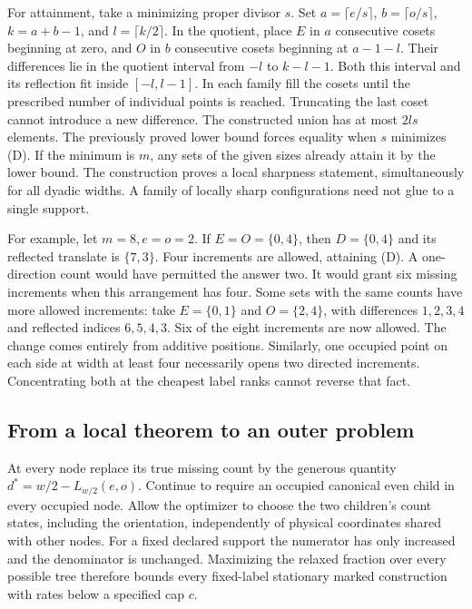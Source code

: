 For attainment, take a minimizing proper divisor \(s\). Set \(a=\lceil e/s\rceil\), \(b=\lceil o/s\rceil\), \(k=a+b-1\), and \(l=\lceil k/2\rceil\). In the quotient, place \(E\) in \(a\) consecutive cosets beginning at zero, and \(O\) in \(b\) consecutive cosets beginning at \(a-1-l\). Their differences lie in the quotient interval from \(-l\) to \(k-l-1\). Both this interval and its reflection fit inside \([-l,l-1]\). In each family fill the cosets until the prescribed number of individual points is reached. Truncating the last coset cannot introduce a new difference. The constructed union has at most \(2ls\) elements. The previously proved lower bound forces equality when \(s\) minimizes (D). If the minimum is \(m\), any sets of the given sizes already attain it by the lower bound. The construction proves a local sharpness statement, simultaneously for all dyadic widths. A family of locally sharp configurations need not glue to a single support.

For example, let \(m=8,e=o=2\). If \(E=O=\{0,4\}\), then \(D=\{0,4\}\) and its reflected translate is \(\{7,3\}\). Four increments are allowed, attaining (D). A one-direction count would have permitted the answer two. It would grant six missing increments when this arrangement has four. Some sets with the same counts have more allowed increments: take \(E=\{0,1\}\) and \(O=\{2,4\}\), with differences \(1,2,3,4\) and reflected indices \(6,5,4,3\). Six of the eight increments are now allowed. The change comes entirely from additive positions. Similarly, one occupied point on each side at width at least four necessarily opens two directed increments. Concentrating both at the cheapest label ranks cannot reverse that fact.

\subsection{From a local theorem to an outer problem}
At every node replace its true missing count by the generous quantity \(d^*=w/2-L_{w/2}(e,o)\). Continue to require an occupied canonical even child in every occupied node. Allow the optimizer to choose the two children's count states, including the orientation, independently of physical coordinates shared with other nodes. For a fixed declared support the numerator has only increased and the denominator is unchanged. Maximizing the relaxed fraction over every possible tree therefore bounds every fixed-label stationary marked construction with rates below a specified cap \(c\).

